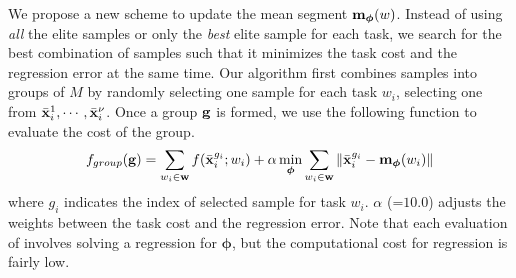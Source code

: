  
We propose a new scheme to update the mean segment
$\mathbf{m}_{\boldsymbol{\phi}}(w)$. Instead of using \emph{all} the elite
samples or only the \emph{best} elite sample for each task, we search
for the best combination of samples such that it minimizes the task
cost and the regression error at the same
time. Our algorithm first combines samples into groups of $M$ by
randomly selecting one sample for each task $w_i$, \ie selecting one
from $\bar{\mathbf{x}}_i^1, \cdots, \bar{\mathbf{x}}_i^\nu$. Once a group
$\mathbf{g}$ is formed, we use the following function to evaluate the
cost of the group.
\begin{equation}
  f_{group}(\mathbf{g}) = \sum_{w_i \in \mathbf{w}} f(\bar{\mathbf{x}}^{g_i}_i; w_i)
  + \alpha \min_{\boldsymbol{\phi}} \sum_{w_i \in \mathbf{w}} \| \bar{\mathbf{x}}^{g_i}_i -
  \mathbf{m}_{\boldsymbol{\phi}} (w_i) \|
  \label{eq:optskills_group_eval}
\end{equation}  
where $g_i$ indicates the index of selected sample for task
$w_i$. $\alpha$ (=$10.0$) adjusts the weights between the task cost
and the 
regression error. Note that each evaluation of 
involves solving a regression for $\boldsymbol{\phi}$, but the
computational cost for regression is fairly low.

